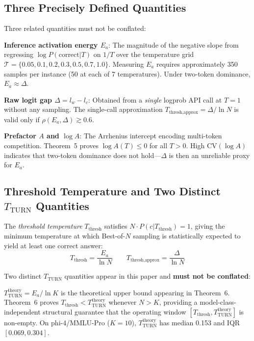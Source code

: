 \documentclass[11pt,letterpaper,twocolumn]{article}
\begin{document}
\subsection{Three Precisely Defined Quantities}

Three related quantities must not be conflated:

\textbf{Inference activation energy $E_a$}: The magnitude of the negative slope from
regressing $\log P(\text{correct}|T)$ on $1/T$ over the temperature grid $\mathcal{T} =
\{0.05, 0.1, 0.2, 0.3, 0.5, 0.7, 1.0\}$. Measuring $E_a$ requires approximately 350
samples per instance (50 at each of 7 temperatures). Under two-token dominance, $E_a
\approx \Delta$.

\textbf{Raw logit gap $\Delta = l_w - l_c$}: Obtained from a \emph{single} logprob API
call at $T=1$ without any sampling. The single-call approximation $T_\text{thresh,approx}
= \Delta / \ln N$ is valid only if $\rho(E_a, \Delta) \gtrsim 0.6$.

\textbf{Prefactor $A$ and $\log A$}: The Arrhenius intercept encoding multi-token
competition. Theorem~5 proves $\log A(T) \leq 0$ for all $T > 0$. High $\text{CV}(\log
A)$ indicates that two-token dominance does not hold---$\Delta$ is then an unreliable
proxy for $E_a$.

\subsection{\texorpdfstring{Threshold Temperature and Two Distinct $T_{\text{TURN}}$ Quantities}{Threshold Temperature and Two Distinct T-TURN Quantities}}

The \emph{threshold temperature} $T_\text{thresh}$ satisfies $N \cdot P(c|T_\text{thresh})
= 1$, giving the minimum temperature at which Best-of-$N$ sampling is statistically
expected to yield at least one correct answer:
\[
  T_\text{thresh} = \frac{E_a}{\ln N} \qquad T_\text{thresh,approx} = \frac{\Delta}{\ln N}
\]

Two distinct $T_\text{TURN}$ quantities appear in this paper and \textbf{must not be
conflated}:

$T_\text{TURN}^\text{theory} = E_a/\ln K$ is the theoretical upper bound appearing in
Theorem~6. Theorem~6 proves $T_\text{thresh} < T_\text{TURN}^\text{theory}$ whenever
$N > K$, providing a model-class-independent structural guarantee that the operating
window $[T_\text{thresh}, T_\text{TURN}^\text{theory}]$ is non-empty. On phi-4/MMLU-Pro
($K=10$), $T_\text{TURN}^\text{theory}$ has median 0.153 and IQR $[0.069, 0.304]$.
\end{document}
